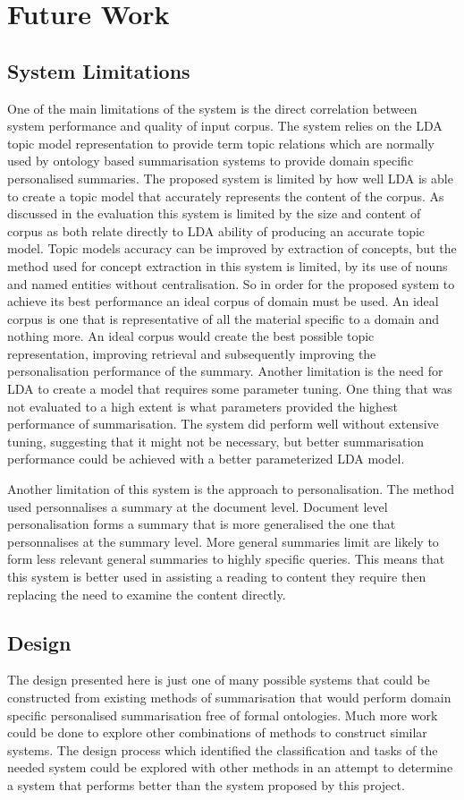 \chapter{Future Work}
\label{chp:6}
\section{System Limitations}
One of the main limitations of the system is the direct correlation between system performance and quality of input corpus. The system relies on the LDA topic model representation to provide term topic relations which are normally used by ontology based summarisation systems to provide domain specific personalised summaries. The proposed system is limited by how well LDA is able to create a topic model that accurately represents the content of the corpus. As discussed in the evaluation this system is limited by the size and content of corpus as both relate directly to LDA ability of producing an accurate topic model. Topic models accuracy can be improved by extraction of concepts, but the method used for concept extraction in this system is limited, by its use of nouns and named entities without centralisation. So in order for the proposed system to achieve its best performance an ideal corpus of domain must be used. An ideal corpus is one that is representative of all the material specific to a domain and nothing more. An ideal corpus would create the best possible topic representation, improving retrieval and subsequently improving the personalisation performance of the summary. Another limitation is the need for LDA to create a model that requires some parameter tuning. One thing that was not evaluated to a high extent is what parameters provided the highest performance of summarisation. The system did perform well without extensive tuning, suggesting that it might not be necessary, but better summarisation performance could be achieved with a better parameterized LDA model.

Another limitation of this system is the approach to personalisation. The method used personnalises a summary at the document level. Document level personalisation forms a summary that is more generalised the one that personnalises at the summary level. More general summaries limit are likely to form less relevant general summaries to highly specific queries. This means that this system is better used in assisting a reading to content they require then replacing the need to examine the content directly. 

\section{Design}
The design presented here is just one of many possible systems that could be constructed from existing methods of summarisation that would perform domain specific personalised summarisation free of formal ontologies. Much more work could be done to explore other combinations of methods to construct similar systems. The design process which identified the classification and tasks of the needed system could be explored with other methods in an attempt to determine a system that performs better than the system proposed by this project. 

